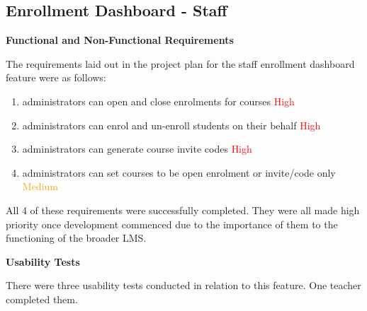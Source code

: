 \subsection{Enrollment Dashboard - Staff}
\textbf{Functional and Non-Functional Requirements}

The requirements laid out in the project plan for the staff enrollment dashboard feature were as follows:
    \begin{enumerate}
    \item administrators can open and close enrolments for courses \textcolor{Red}{High}
    \item administrators can enrol and un-enroll students on their behalf \textcolor{Red}{High}
    \item administrators can generate course invite codes \textcolor{Red}{High}
    \item administrators can set courses to be open enrolment or invite/code only \textcolor{Orange}{Medium}
    \end{enumerate}
All 4 of these requirements were successfully completed. They were all made high priority once development commenced due to the importance of them to the functioning of the broader LMS.

\textbf{Usability Tests}

There were three usability tests conducted in relation to this feature. One teacher completed them.

